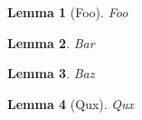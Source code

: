 \documentclass{article}
\newtheorem{lemma}{Lemma}
\begin{document}
\begin{lemma}[Foo]\label{thm:foo}
    Foo
\end{lemma}

\begin{lemma}\label{thm:bar}
    Bar
\end{lemma}

\begin{lemma}\label{thm:baz}
    Baz
\end{lemma}

\begin{lemma}[Qux]
    Qux
\end{lemma}
\end{document}
